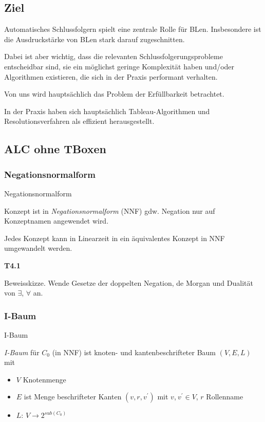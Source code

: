 \subsection{Ziel}

Automatisches Schlussfolgern spielt eine zentrale Rolle für BLen. Insbesondere ist die Ausdruckstärke von BLen stark darauf zugeschnitten.

Dabei ist aber wichtig, dass die relevanten Schlussfolgerungsprobleme entscheidbar sind, sie ein möglichst geringe Komplexität haben und/oder Algorithmen existieren, die sich in der Praxis performant verhalten.

Von uns wird hauptsächlich das Problem der Erfüllbarkeit betrachtet.

In der Praxis haben sich hauptsächlich Tableau-Algorithmen und Resolutionsverfahren als effizient herausgestellt.

\subsection{ALC ohne TBoxen}\label{alc-ohne-tboxen}

\subsubsection{Negationsnormalform}\label{negationsnormalform}

\begin{definition}{Negationsnormalform}

Konzept ist in \emph{Negationsnormalform} (NNF) gdw. Negation nur auf
Konzeptnamen angewendet wird.
\end{definition}

\begin{lemma}
Jedes Konzept kann in Linearzeit in ein äquivalentes Konzept in NNF
umgewandelt werden.
\end{lemma}

\textbf{T4.1}

Beweisskizze. Wende Gesetze der doppelten Negation, de Morgan und
Dualität von $\exists$, $\forall$ an.

\subsubsection{I-Baum}\label{i-baum}

\begin{definition}{I-Baum}

\emph{I-Baum} für $C_{0}$ (in NNF) ist knoten- und kantenbeschrifteter
Baum $\left( V,E,L \right)$ mit

\begin{itemize}
\item
  $V$ Knotenmenge
\item
  $E$ ist Menge beschrifteter Kanten $\left( v,r,v^{'} \right)$ mit
  $v$,$\ v^{'} \in V$, $r$ Rollenname
\item
  $L$: $V \rightarrow 2^{sub(C_{0})}$
\end{itemize}
\end{definition}

